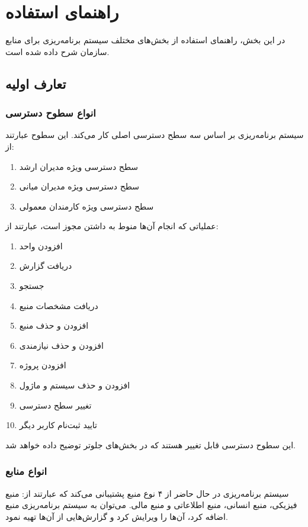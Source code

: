 
\chapter{راهنمای استفاده}


در این بخش، راهنمای استفاده از بخش‌های مختلف سیستم برنامه‌ریزی برای منابع سازمان شرح داده شده است.

\renewcommand*\contentsname{فهرست راهنمای استفاده}
\localtableofcontents

\newpage
\section{تعارف اولیه}
\subsection{انواع سطوح دسترسی}
سیستم برنامه‌ریزی بر اساس سه سطح دسترسی اصلی کار می‌کند. این سطوح عبارتند از:
\begin{enumerate}
	\item سطح دسترسی ویژه مدیران ارشد
	\item سطح دسترسی ویژه مدیران میانی
	\item سطح دسترسی ویژه کارمندان معمولی \\
\end{enumerate}


عملیاتی که انجام آن‌ها منوط به داشتن مجوز است، عبارتند از:
\begin{enumerate}
	\item افزودن واحد
	\item دریافت گزارش
	\item جستجو
	\item دریافت مشخصات منبع
	\item افزودن و حذف منبع
	\item افزودن و حذف نیازمندی
	\item افزودن  پروژه
	\item افزودن و حذف سیستم و ماژول
	\item تغییر سطح دسترسی
	\item تایید ثبت‌نام کاربر دیگر
\end{enumerate}

این سطوح دسترسی قابل تغییر هستند که در بخش‌های جلوتر توضیح داده خواهد شد.

\subsection{انواع منابع}
سیستم برنامه‌ریزی در حال حاضر از ۴ نوع منبع پشتیبانی می‌کند که عبارتند از: منبع فیزیکی، منبع انسانی، منبع اطلاعاتی و منبع مالی. می‌توان به سیستم برنامه‌ریزی منبع اضافه کرد، آن‌ها را ویرایش کرد و گزارش‌هایی از آن‌ها تهیه نمود.

